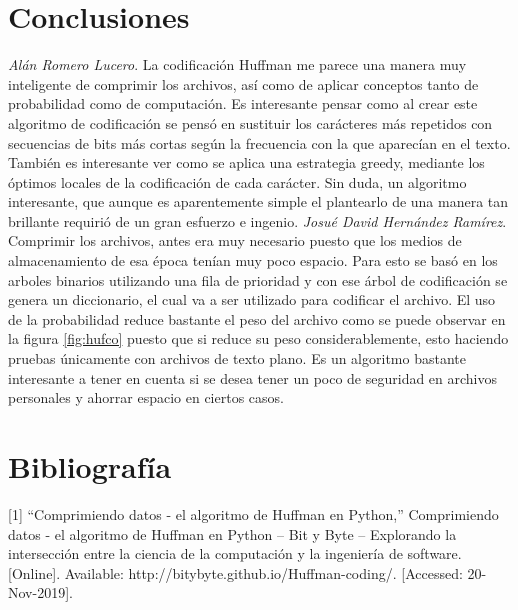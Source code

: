 \documentclass[12pt,twoside]{article}
\begin{document}
\newpage
\vfill
\clearpage

\section{Conclusiones}
\textit{Al\'an Romero Lucero}. La codificaci\'on Huffman me parece una manera muy inteligente de comprimir los archivos, as\'i como de aplicar conceptos tanto de probabilidad como de computaci\'on. Es interesante pensar como al crear este algoritmo de codificaci\'on se pens\'o en sustituir los car\'acteres m\'as repetidos con secuencias de bits m\'as cortas seg\'un la frecuencia con la que aparec\'ian en el texto.  Tambi\'en es interesante ver como se aplica una estrategia greedy, mediante los \'optimos locales de la codificaci\'on de cada car\'acter. Sin duda, un algoritmo interesante, que aunque es aparentemente simple el plantearlo de una manera tan brillante requiri\'o de un gran esfuerzo e ingenio.
\newline\newline
\textit{Josu\'e David Hern\'andez Ram\'irez}. 
Comprimir los archivos, antes era muy necesario puesto que los medios de almacenamiento de esa \'epoca ten\'ian muy poco espacio.
\newline
Para esto se bas\'o en los arboles binarios utilizando una fila de prioridad y con ese \'arbol de codificaci\'on se genera un diccionario, el cual va a ser utilizado para codificar el archivo. 
\newline
El uso de la probabilidad reduce bastante el peso del archivo como se puede observar en la figura \ref{fig:hufco} puesto que si reduce su peso considerablemente, esto haciendo pruebas \'unicamente con archivos de texto plano.
\newline
Es un algoritmo bastante interesante a tener en cuenta si se desea tener un poco de seguridad en archivos personales y ahorrar espacio en ciertos casos.


\section{Bibliograf\'ia}

[1] “Comprimiendo datos - el algoritmo de Huffman en Python,” Comprimiendo datos - el algoritmo de Huffman en Python – Bit y Byte – Explorando la intersección entre la ciencia de la computación y la ingeniería de software. [Online]. Available: http://bitybyte.github.io/Huffman-coding/. [Accessed: 20-Nov-2019]. 
\end{document}
